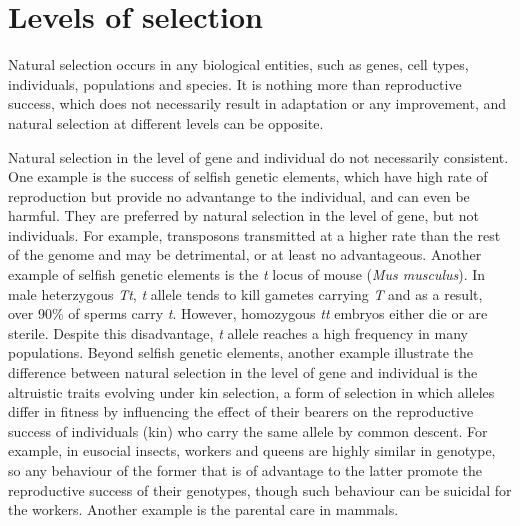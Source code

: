 \documentclass[11pt]{article}
\begin{document}
\begin{sloppypar}
\section{Levels of selection}
Natural selection occurs in any biological entities, such as genes, cell types, individuals, populations and species. 
It is nothing more than reproductive success, which does not necessarily result in adaptation or any improvement, and natural selection at different levels can be opposite. 

\par

Natural selection in the level of gene and individual do not necessarily consistent. 
One example is the success of selfish genetic elements, which have high rate of reproduction but provide no advantange to the individual, and can even be harmful. 
They are preferred by natural selection in the level of gene, but not individuals. 
For example, transposons transmitted at a higher rate than the rest of the genome and may be detrimental, or at least no advantageous. 
Another example of selfish genetic elements is the \textit{t} locus of mouse (\textit{Mus musculus}). 
In male heterzygous \textit{Tt}, \textit{t} allele tends to kill gametes carrying \textit{T} and as a result, over 90\% of sperms carry \textit{t}. 
However, homozygous \textit{tt} embryos either die or are sterile. 
Despite this disadvantage, \textit{t} allele reaches a high frequency in many populations. 
Beyond selfish genetic elements, another example illustrate the difference between natural selection in the level of gene and individual is the altruistic traits evolving under kin selection, a form of selection in which alleles differ in fitness by influencing the effect of their bearers on the reproductive success of individuals (kin) who carry the same allele by common descent. 
For example, in eusocial insects, workers and queens are highly similar in genotype, so any behaviour of the former that is of advantage to the latter promote the reproductive success of their genotypes, though such behaviour can be suicidal for the workers. 
Another example is the parental care in mammals. 

\par


\end{sloppypar}
\end{document}
